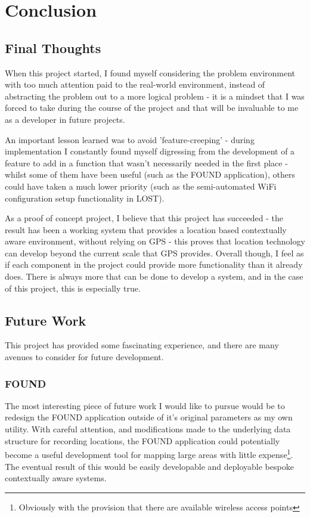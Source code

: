 \documentclass[11pt]{informatics-report}
\begin{document}
\chapter{Conclusion}

\section{Final Thoughts}

When this project started, I found myself considering the problem environment with too much attention paid to the real-world environment, instead of abstracting the problem out to a more logical problem - it is a mindset that I was forced to take during the course of the project and that will be invaluable to me as a developer in future projects. 

An important lesson learned was to avoid 'feature-creeping' - during implementation I constantly found myself digressing from the development of a feature to add in a function that wasn't necessarily needed in the first place - whilst some of them have been useful (such as the FOUND application), others could have taken a much lower priority (such as the semi-automated WiFi configuration setup functionality in LOST). 

As a proof of concept project, I believe that this project has succeeded - the result has been a working system that provides a location based contextually aware environment, without relying on GPS - this proves that location technology can develop beyond the current scale that GPS provides. Overall though, I feel as if each component in the project could provide more functionality than it already does. There is always more that can be done to develop a system, and in the case of this project, this is especially true. 

\section{Future Work}

This project has provided some fascinating experience, and there are many avenues to consider for future development.

\subsection{FOUND}

The most interesting piece of future work I would like to pursue would be to redesign the FOUND application outside of it's original parameters as my own utility. With careful attention, and modifications made to the underlying data structure for recording locations, the FOUND application could potentially become a useful development tool for mapping large areas with little expense\footnote{Obviously with the provision that there are available wireless access points}. The eventual result of this would be easily developable and deployable bespoke contextually aware systems. 
\end{document}
